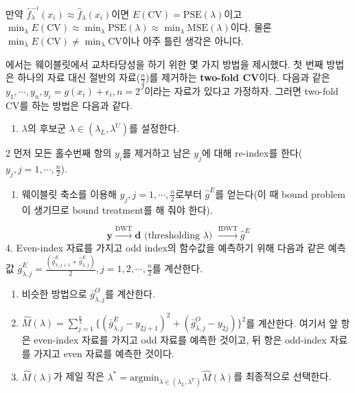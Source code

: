 \documentclass[b5paper,]{scrbook}
\providecommand{\tightlist}{%
  \setlength{\itemsep}{0pt}\setlength{\parskip}{0pt}}
\theoremstyle{plain}
\theoremstyle{definition}
\numberwithin{equation}{section}
\begin{document}
만약
\(\hat{f}_{\lambda}^{-i}(x_{i}) \approx \hat{f}_{\lambda}(x_{i})\)이면
\(E(\text{CV})=\text{PSE}(\lambda)\)이고
\(\min_{\lambda}E(\text{CV}) \approx \min_{\lambda}\text{PSE}(\lambda) \approx \min_{\lambda}\text{MSE}(\lambda)\)이다.
물론 \(\min_{\lambda}E(\text{CV}) \neq \min_{\lambda}\text{CV}\)이나
아주 틀린 생각은 아니다.

\citep{Nason1996}에서는 웨이블릿에서 교차타당성을 하기 위한 몇 가지
방법을 제시했다. 첫 번째 방법은 하나의 자료 대신 절반의
자료(\(\frac{n}{2}\))를 제거하는 \textbf{two-fold CV}이다. 다음과 같은
\(y_{1}, \cdots, y_{n}, y_{i}=g(x_{i})+\epsilon_{i}, n=2^{J}\)이라는
자료가 있다고 가정하자. 그러면 two-fold CV를 하는 방법은 다음과 같다.

\begin{enumerate}
\def\labelenumi{\arabic{enumi}.}
\tightlist
\item
  \(\lambda\)의 후보군 \(\lambda \in (\lambda_{L}, \lambda^{U})\)를
  설정한다.
\end{enumerate}

2 먼저 모든 홀수번째 항의 \(y_{i}\)를 제거하고 남은 \(y_{j}\)에 대해
re-index를 한다(\(y_{j},j=1,\cdots,\frac{n}{2}\)).

\begin{enumerate}
\def\labelenumi{\arabic{enumi}.}
\setcounter{enumi}{2}
\tightlist
\item
  웨이블릿 축소를 이용해 \(y_{j},j=1,\cdots,\frac{n}{2}\)로부터
  \(\hat{g}^{E}\)를 얻는다(이 때 bound problem이 생기므로 bound
  treatment를 해 줘야 한다).
\end{enumerate}

\[\mathbf{y} \xrightarrow{\text{DWT}} \mathbf{d} \text{ (thresholding $\lambda$) } \xrightarrow{\text{IDWT}}  \hat{g}^{E}\]
4. Even-index 자료를 가지고 odd index의 함수값을 예측하기 위해 다음과
같은 예측값
\(\bar{g}_{\lambda,j}^{E}=\frac{(\hat{g}_{\lambda,j+1}^{E}+\hat{g}_{\lambda,j}^{E})}{2}, j=1,2,\cdots,\frac{n}{2}\)를
계산한다.

\begin{enumerate}
\def\labelenumi{\arabic{enumi}.}
\setcounter{enumi}{4}
\item
  비슷한 방법으로 \(\bar{g}_{\lambda,j}^{O}\)를 계산한다.
\item
  \(\hat{M}(\lambda)=\sum_{j=1}^{\frac{n}{2}}\{(\bar{g}_{\lambda,j}^{E}-y_{2j+1})^{2}+(\bar{g}_{\lambda,j}^{O}-y_{2j})\}^{2}\)를
  계산한다. 여기서 앞 항은 even-index 자료를 가지고 odd 자료를 예측한
  것이고, 뒤 항은 odd-index 자료를 가지고 even 자료를 예측한 것이다.
\item
  \(\hat{M}(\lambda)\)가 제일 작은
  \(\lambda^{*}=\text{argmin}_{\lambda \in (\lambda_{L},\lambda^{U})} \hat{M}(\lambda)\)를
  최종적으로 선택한다.
\end{enumerate}
\end{document}
